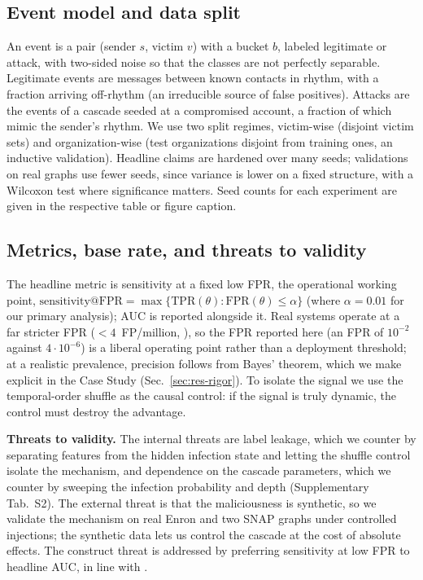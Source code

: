 \subsection{Event model and data split}
\label{sec:m-events}
An event is a pair (sender $s$, victim $v$) with a bucket $b$, labeled legitimate or attack, with two-sided noise so
that the classes are not perfectly separable. Legitimate events are messages between known contacts in rhythm,
with a fraction arriving off-rhythm (an irreducible source of false positives). Attacks are the events of a
cascade seeded at a compromised account, a fraction of which mimic the sender's rhythm. We use two split
regimes, victim-wise (disjoint victim sets) and organization-wise (test organizations disjoint from training
ones, an inductive validation). Headline claims are hardened over many seeds; validations on real graphs use
fewer seeds, since variance is lower on a fixed structure, with a Wilcoxon test where significance matters.
Seed counts for each experiment are given in the respective table or figure caption.

\subsection{Metrics, base rate, and threats to validity}
\label{sec:m-metrics}
The headline metric is sensitivity at a fixed low FPR, the operational working point,
$\text{sensitivity}@\mathrm{FPR} = \max\{\mathrm{TPR}(\theta):\mathrm{FPR}(\theta)\le\alpha\}$ (where $\alpha=0.01$ for our primary analysis); AUC is reported
alongside it. Real systems operate at a far stricter FPR ($<\!4$~FP/million, \citep{ho2019detecting}), so the FPR
reported here (an FPR of $10^{-2}$ against $4\cdot10^{-6}$) is a liberal operating point rather than a
deployment threshold; at a realistic prevalence, precision
follows from Bayes' theorem, which we make explicit in the Case Study (Sec.~\ref{sec:res-rigor}). To isolate the
signal we use the temporal-order shuffle as the causal control: if the signal is truly dynamic, the control
must destroy the advantage.

\smallskip\noindent\textbf{Threats to validity.} The internal threats are label leakage, which we counter by
separating features from the hidden infection state and letting the shuffle control isolate the mechanism, and
dependence on the cascade parameters, which we counter by sweeping the infection probability and depth
(Supplementary Tab.~S2). The external threat is that the maliciousness is synthetic, so we validate the mechanism on
real Enron and two SNAP graphs under controlled injections; the synthetic data lets us control the cascade at
the cost of absolute effects. The construct threat is addressed by preferring sensitivity at low FPR to
headline AUC, in line with \citep{arp2022dos,pendlebury2019tesseract}.
